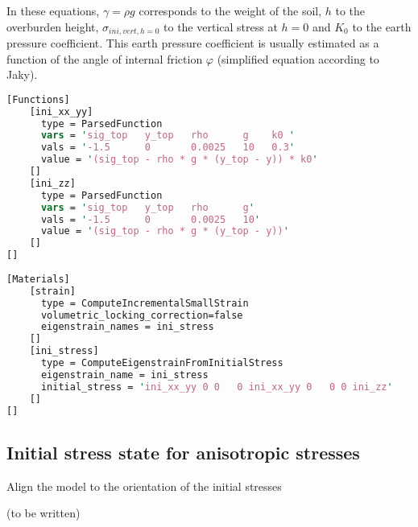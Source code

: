 In these equations, $\gamma=\rho g$ corresponds to the weight of the soil, $h$
to the overburden height, $\sigma_{ini,vert,h=0}$ to the vertical stress at
$h=0$ and $K_0$ to the earth pressure coefficient. This earth pressure
coefficient is usually estimated as a function of the angle of internal
friction $\varphi$ (simplified equation according to Jaky).

\begin{lstlisting}[language=perl, caption={Definition of a geostatic stress state using ‘ComputeEigenstrainFromInitialStress’ },label={initial-conditions-ComputeEigenstrainFromInitialStress}]
[Functions]
    [ini_xx_yy]
      type = ParsedFunction
      vars = 'sig_top   y_top   rho      g    k0 '
      vals = '-1.5      0       0.0025   10   0.3'
      value = '(sig_top - rho * g * (y_top - y)) * k0'
    []
    [ini_zz]
      type = ParsedFunction
      vars = 'sig_top   y_top   rho      g'
      vals = '-1.5      0       0.0025   10'
      value = '(sig_top - rho * g * (y_top - y))'
    []
[]
  
[Materials]
    [strain]
      type = ComputeIncrementalSmallStrain
      volumetric_locking_correction=false
      eigenstrain_names = ini_stress
    []
    [ini_stress]
      type = ComputeEigenstrainFromInitialStress
      eigenstrain_name = ini_stress
      initial_stress = 'ini_xx_yy 0 0   0 ini_xx_yy 0   0 0 ini_zz'
    []
[]
\end{lstlisting}

\subsection{Initial stress state for anisotropic stresses}
\label{chap:IC-stress-state-anisotropic}

Align the model to the orientation of the initial stresses

(to be written)
